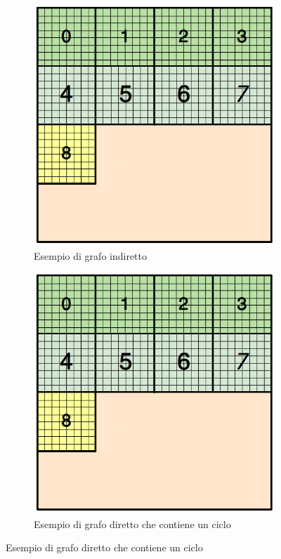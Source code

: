 \begin{figure}[H]
	\centering
	\begin{subfigure}{0.3\textwidth}
		\centering
		\includegraphics[width=0.8\linewidth]{immagini/block_on_grid.png}
		\caption{Esempio di grafo indiretto}
		\label{fig:udir_graph}
	\end{subfigure}%
\begin{subfigure}{0.3\textwidth}
	\centering
	\includegraphics[width=0.8\linewidth]{immagini/block_on_grid.png}
	\caption{Esempio di grafo diretto che contiene un ciclo}
	\label{fig:dir_graph}
\end{subfigure}%

\end{figure}
